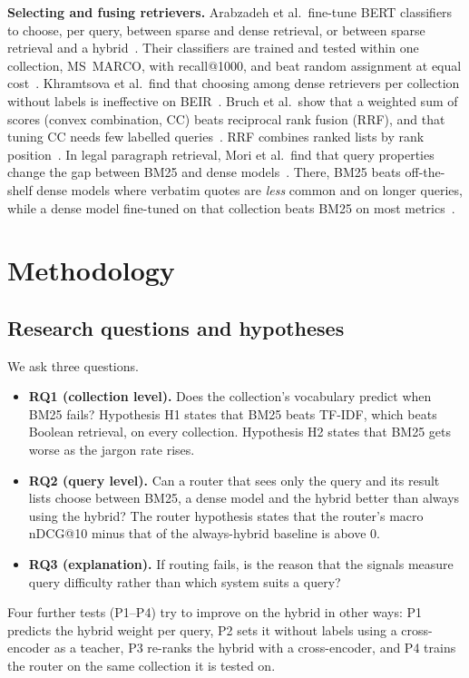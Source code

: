 \documentclass[conference]{IEEEtran}
\makeatletter
\newcommand{\ndcg}{nDCG@10}
\makeatother
\begin{document}
\textbf{Selecting and fusing retrievers.} Arabzadeh et al.\ fine-tune BERT classifiers to choose, per query, between sparse and dense retrieval, or between sparse retrieval and a hybrid~\cite{arabzadeh2021predicting}. Their classifiers are trained and tested within one collection, MS~MARCO, with recall@1000, and beat random assignment at equal cost~\cite{arabzadeh2021predicting}. Khramtsova et al.\ find that choosing among dense retrievers per collection without labels is ineffective on BEIR~\cite{khramtsova2023selecting}. Bruch et al.\ show that a weighted sum of scores (convex combination, CC) beats reciprocal rank fusion (RRF), and that tuning CC needs few labelled queries~\cite{bruch2024fusion}. RRF combines ranked lists by rank position~\cite{cormack2009rrf}. In legal paragraph retrieval, Mori et al.\ find that query properties change the gap between BM25 and dense models~\cite{mori2025assessing}. There, BM25 beats off-the-shelf dense models where verbatim quotes are \emph{less} common and on longer queries, while a dense model fine-tuned on that collection beats BM25 on most metrics~\cite{mori2025assessing}.

\section{Methodology}
\label{sec:method}
\subsection{Research questions and hypotheses}
We ask three questions.
\begin{itemize}
\item \textbf{RQ1 (collection level).} Does the collection's vocabulary predict when BM25 fails? Hypothesis H1 states that BM25 beats TF-IDF, which beats Boolean retrieval, on every collection. Hypothesis H2 states that BM25 gets worse as the jargon rate rises.
\item \textbf{RQ2 (query level).} Can a router that sees only the query and its result lists choose between BM25, a dense model and the hybrid better than always using the hybrid? The router hypothesis states that the router's macro \ndcg{} minus that of the always-hybrid baseline is above 0.
\item \textbf{RQ3 (explanation).} If routing fails, is the reason that the signals measure query difficulty rather than which system suits a query?
\end{itemize}
Four further tests (P1--P4) try to improve on the hybrid in other ways: P1 predicts the hybrid weight per query, P2 sets it without labels using a cross-encoder as a teacher, P3 re-ranks the hybrid with a cross-encoder, and P4 trains the router on the same collection it is tested on.
\end{document}
